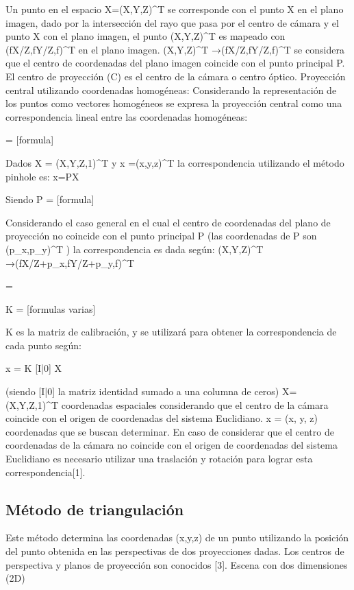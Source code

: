 Un punto en el espacio X=(X,Y,Z)^T se corresponde con el punto X en el plano imagen, dado por la intersección del rayo que pasa por el centro de cámara y el punto X con el plano imagen, el punto (X,Y,Z)^T es mapeado con (fX/Z,fY/Z,f)^T en el plano imagen.
(X,Y,Z)^T   →(fX/Z,fY/Z,f)^T      se considera que el centro de coordenadas del plano imagen coincide con el punto principal P.
El centro de proyección (C) es el centro de la cámara o centro óptico.
Proyección central utilizando coordenadas homogéneas:
Considerando la representación de los puntos como vectores homogéneos  se expresa la proyección central como una correspondencia lineal entre las coordenadas homogéneas:


           =
[formula]

Dados X = (X,Y,Z,1)^T    y   x =(x,y,z)^T   la correspondencia utilizando el método pinhole es:
x=PX

Siendo P = [formula]


Considerando el caso general en el cual el centro de coordenadas del plano de proyección no coincide con el punto principal P (las coordenadas de P son (p_x,p_y)^T   ) la correspondencia es dada según:
(X,Y,Z)^T   →(fX/Z+p_x,fY/Z+p_y,f)^T


               =    




       K =
[formulas varias]

K es la matriz de calibración, y se utilizará para obtener la correspondencia de cada punto según:

x = K [I|0] X    

(siendo [I|0] la matriz identidad sumado a una columna de ceros)
X= (X,Y,Z,1)^T  coordenadas espaciales considerando que el centro de la cámara coincide con el origen de coordenadas del sistema Euclidiano.
x = (x, y, z) coordenadas que se buscan determinar.
En caso de considerar que el centro de coordenadas de la cámara no coincide con el origen de coordenadas del sistema Euclidiano es necesario utilizar una traslación y rotación para lograr esta correspondencia[1].


\subsection{Método de triangulación}
Este método determina las coordenadas (x,y,z) de un punto utilizando la posición del punto obtenida en las perspectivas de dos proyecciones dadas.
Los centros de perspectiva y planos de proyección son conocidos [3].
Escena con dos dimensiones (2D)

